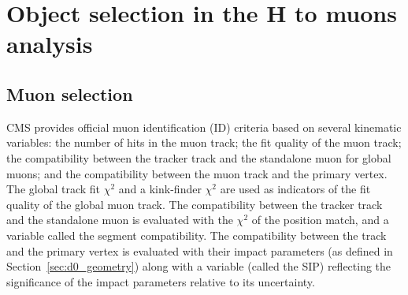 \section{Object selection in the H to muons analysis}\label{sec:obj_sel}

\subsection{Muon selection}\label{sec:sel_muon}

CMS provides official muon identification (ID) criteria based on several kinematic variables:
the number of hits in the muon track; the fit quality of the muon track; 
the compatibility between the tracker track and the standalone muon for global muons;
and the compatibility between the muon track and the primary vertex.
The global track fit $\chi^{2}$ and a kink-finder $\chi^{2}$ are used as indicators of the fit quality of the global muon track.
The compatibility between the tracker track and the standalone muon is evaluated with the $\chi^{2}$ of the position match, 
and a variable called the segment compatibility.
The compatibility between the track and the primary vertex is evaluated with their impact parameters (as defined in Section~\ref{sec:d0_geometry})
along with a variable (called the SIP) reflecting the significance of the impact parameters relative to its uncertainty.

